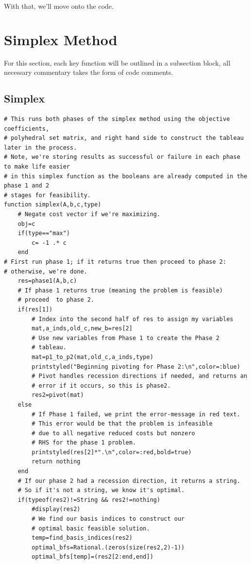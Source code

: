 \documentclass[11pt]{article}
\begin{document}
With that, we'll move onto the code.

\section{Simplex Method}
\label{sec:org2396421}
For this section, each key function will be outlined in a subsection block, all necessary commentary takes the form of code comments.

\subsection{Simplex}
\label{sec:org3b58084}
\begin{verbatim}
# This runs both phases of the simplex method using the objective coefficients,
# polyhedral set matrix, and right hand side to construct the tableau later in the process.
# Note, we're storing results as successful or failure in each phase to make life easier
# in this simplex function as the booleans are already computed in the phase 1 and 2
# stages for feasibility.
function simplex(A,b,c,type)
    # Negate cost vector if we're maximizing.
    obj=c
    if(type=="max")
        c= -1 .* c
    end
# First run phase 1; if it returns true then proceed to phase 2:
# otherwise, we're done.
    res=phase1(A,b,c)
    # If phase 1 returns true (meaning the problem is feasible)
    # proceed  to phase 2.
    if(res[1])
        # Index into the second half of res to assign my variables
        mat,a_inds,old_c,new_b=res[2]
        # Use new variables from Phase 1 to create the Phase 2
        # tableau.
        mat=p1_to_p2(mat,old_c,a_inds,type)
        printstyled("Beginning pivoting for Phase 2:\n",color=:blue)
        # Pivot handles recession directions if needed, and returns an
        # error if it occurs, so this is phase2.
        res2=pivot(mat)
    else
        # If Phase 1 failed, we print the error-message in red text.
        # This error would be that the problem is infeasible
        # due to all negative reduced costs but nonzero
        # RHS for the phase 1 problem.
        printstyled(res[2]*".\n",color=:red,bold=true)
        return nothing
    end
    # If our phase 2 had a recession direction, it returns a string.
    # So if it's not a string, we know it's optimal.
    if(typeof(res2)!=String && res2!=nothing)
        #display(res2)
        # We find our basis indices to construct our
        # optimal basic feasible solution.
        temp=find_basis_indices(res2)
        optimal_bfs=Rational.(zeros(size(res2,2)-1))
        optimal_bfs[temp]=(res2[2:end,end])

\end{verbatim}
\end{document}
